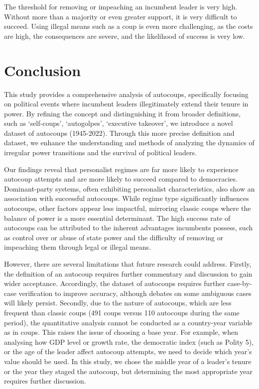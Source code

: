 \documentclass[
  12pt,
]{report}
\begin{document}
The threshold for removing or impeaching an incumbent leader is very
high. Without more than a majority or even greater support, it is very
difficult to succeed. Using illegal means such as a coup is even more
challenging, as the costs are high, the consequences are severe, and the
likelihood of success is very low.

\section{Conclusion}\label{conclusion-1}

This study provides a comprehensive analysis of autocoups, specifically
focusing on political events where incumbent leaders illegitimately
extend their tenure in power. By refining the concept and distinguishing
it from broader definitions, such as `self-coups', `autogolpes',
`executive takeover', we introduce a novel dataset of autocoups
(1945-2022). Through this more precise definition and dataset, we
enhance the understanding and methods of analyzing the dynamics of
irregular power transitions and the survival of political leaders.

Our findings reveal that personalist regimes are far more likely to
experience autocoup attempts and are more likely to succeed compared to
democracies. Dominant-party systems, often exhibiting personalist
characteristics, also show an association with successful autocoups.
While regime type significantly influences autocoups, other factors
appear less impactful, mirroring classic coups where the balance of
power is a more essential determinant. The high success rate of
autocoups can be attributed to the inherent advantages incumbents
possess, such as control over or abuse of state power and the difficulty
of removing or impeaching them through legal or illegal means.

However, there are several limitations that future research could
address. Firstly, the definition of an autocoup requires further
commentary and discussion to gain wider acceptance. Accordingly, the
dataset of autocoups requires further case-by-case verification to
improve accuracy, although debates on some ambiguous cases will likely
persist. Secondly, due to the nature of autocoups, which are less
frequent than classic coups (491 coups versus 110 autocoups during the
same period), the quantitative analysis cannot be conducted as a
country-year variable as in coups. This raises the issue of choosing a
base year. For example, when analysing how GDP level or growth rate, the
democratic index (such as Polity 5), or the age of the leader affect
autocoup attempts, we need to decide which year's value should be used.
In this study, we chose the middle year of a leader's tenure or the year
they staged the autocoup, but determining the most appropriate year
requires further discussion.
\end{document}
